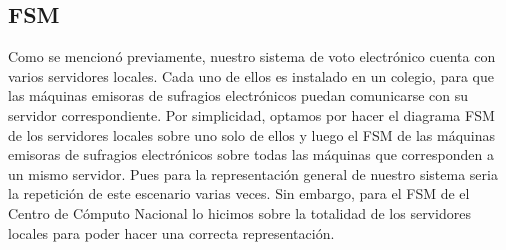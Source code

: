 \documentclass[spanish, 10pt,a4paper]{article}
\numberwithin{equation}{section} %
\begin{document}
\subsection{FSM}
Como se mencionó previamente, nuestro sistema de voto electr\'onico cuenta con varios servidores locales. Cada uno de ellos es instalado en un colegio, para que las m\'aquinas emisoras de sufragios electr\'onicos puedan comunicarse con su servidor correspondiente. Por simplicidad, optamos por hacer el diagrama FSM de los servidores locales sobre uno solo de ellos y luego el FSM de las m\'aquinas emisoras de sufragios electr\'onicos sobre todas las m\'aquinas que corresponden a un mismo servidor. Pues para la representación general de nuestro sistema seria la repetici\'on de este escenario varias veces. Sin embargo, para el FSM de el Centro de Cómputo Nacional lo hicimos sobre la totalidad de los servidores locales para poder hacer una correcta representaci\'on.

\par 
\end{document}
